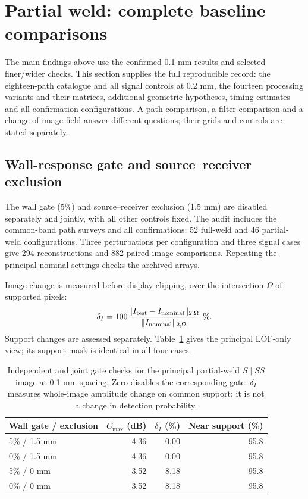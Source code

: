 \section{Partial weld: complete baseline comparisons}

\label{saftapp:archive:partial:complete}
The main findings above use the confirmed 0.1 mm results and selected finer/wider checks. This section supplies the full reproducible record: the eighteen-path catalogue and all signal controls at 0.2 mm, the fourteen processing variants and their matrices, additional geometric hypotheses, timing estimates and all confirmation configurations. A path comparison, a filter comparison and a change of image field answer different questions; their grids and controls are stated separately.

\subsection{Wall-response gate and source--receiver exclusion}
\label{saftapp:archive:partial:gate_audit}
The wall gate (5\%) and source--receiver exclusion (1.5 mm) are disabled separately and jointly, with all other controls fixed. The audit includes the common-band path surveys and all confirmations: 52 full-weld and 46 partial-weld configurations. Three perturbations per configuration and three signal cases give 294 reconstructions and 882 paired image comparisons. Repeating the principal nominal settings checks the archived arrays.

Image change is measured before display clipping, over the intersection $\Omega$ of supported pixels:
\begin{equation}
 \delta_I=100\frac{\lVert I_{\rm test}-I_{\rm nominal}\rVert_{2,\Omega}}
 {\lVert I_{\rm nominal}\rVert_{2,\Omega}}\ \%.
\end{equation}
Support changes are assessed separately. Table~\ref{saftapp:archive:partial:gate_controls} gives the principal LOF-only view; its support mask is identical in all four cases.

\begin{table}[htbp]\centering\small
\caption{Independent and joint gate checks for the principal
partial-weld $S\mid SS${}
image at 0.1 mm spacing. Zero disables the corresponding gate. $\delta_I$ measures whole-image amplitude change on common support; it is not a change in detection probability.}
\label{saftapp:archive:partial:gate_controls}
\begin{tabular}{@{}lrrr@{}}\toprule
Wall gate / exclusion & $C_{\max}$ (dB) & $\delta_I$ (\%) & Near support (\%)\\\midrule
5\% / 1.5 mm & 4.36 & 0.00 & 95.8 \\
0\% / 1.5 mm & 4.36 & 0.00 & 95.8 \\
5\% / 0 mm & 3.52 & 8.18 & 95.8 \\
0\% / 0 mm & 3.52 & 8.18 & 95.8 \\

\bottomrule\end{tabular}
\end{table}

